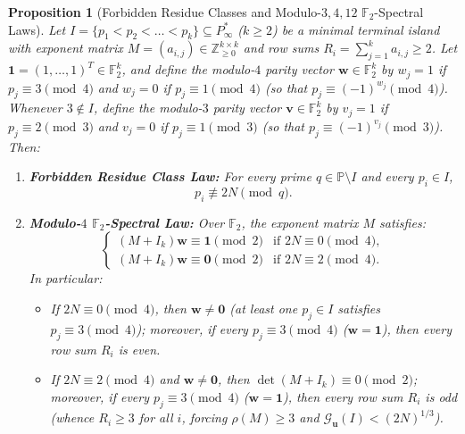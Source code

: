 \documentclass[11pt,a4paper]{article}
\newtheorem{proposition}[theorem]{Proposition}
\theoremstyle{definition}
\begin{document}
\begin{proposition}[Forbidden Residue Classes and Modulo-$3, 4, 12$ $\mathbb{F}_2$-Spectral Laws]
\label{prop:modular_f2_laws}
Let $I = \{p_1 < p_2 < \dots < p_k\} \subseteq P^*_\infty$ ($k \ge 2$) be a minimal terminal island with exponent matrix $M = (a_{i,j}) \in \mathbb{Z}_{\ge 0}^{k \times k}$ and row sums $R_i = \sum_{j=1}^k a_{i,j} \ge 2$. Let $\mathbf{1} = (1, \dots, 1)^T \in \mathbb{F}_2^k$, and define the modulo-$4$ parity vector $\mathbf{w} \in \mathbb{F}_2^k$ by $w_j = 1$ if $p_j \equiv 3 \pmod 4$ and $w_j = 0$ if $p_j \equiv 1 \pmod 4$ (so that $p_j \equiv (-1)^{w_j} \pmod 4$). Whenever $3 \notin I$, define the modulo-$3$ parity vector $\mathbf{v} \in \mathbb{F}_2^k$ by $v_j = 1$ if $p_j \equiv 2 \pmod 3$ and $v_j = 0$ if $p_j \equiv 1 \pmod 3$ (so that $p_j \equiv (-1)^{v_j} \pmod 3$). Then:
\begin{enumerate}
    \item \textbf{Forbidden Residue Class Law:} For every prime $q \in \mathbb{P} \setminus I$ and every $p_i \in I$,
    \begin{equation}
    \label{eq:forbidden_residue_class}
    p_i \not\equiv 2N \pmod q.
    \end{equation}
    \item \textbf{Modulo-$4$ $\mathbb{F}_2$-Spectral Law:} Over $\mathbb{F}_2$, the exponent matrix $M$ satisfies:
    \begin{equation}
    \label{eq:f2_mod4_laws}
    \begin{cases}
    (M + I_k)\mathbf{w} \equiv \mathbf{1} \pmod 2 & \text{if } 2N \equiv 0 \pmod 4, \\[3pt]
    (M + I_k)\mathbf{w} \equiv \mathbf{0} \pmod 2 & \text{if } 2N \equiv 2 \pmod 4.
    \end{cases}
    \end{equation}
    In particular:
    \begin{itemize}
        \item If $2N \equiv 0 \pmod 4$, then $\mathbf{w} \neq \mathbf{0}$ (at least one $p_j \in I$ satisfies $p_j \equiv 3 \pmod 4$); moreover, if every $p_j \equiv 3 \pmod 4$ ($\mathbf{w} = \mathbf{1}$), then every row sum $R_i$ is even.
        \item If $2N \equiv 2 \pmod 4$ and $\mathbf{w} \neq \mathbf{0}$, then $\det(M + I_k) \equiv 0 \pmod 2$; moreover, if every $p_j \equiv 3 \pmod 4$ ($\mathbf{w} = \mathbf{1}$), then every row sum $R_i$ is odd (whence $R_i \ge 3$ for all $i$, forcing $\rho(M) \ge 3$ and $\mathcal{G}_{\mathbf{u}}(I) < (2N)^{1/3}$).

\end{itemize}
\end{enumerate}
\end{proposition}
\end{document}
